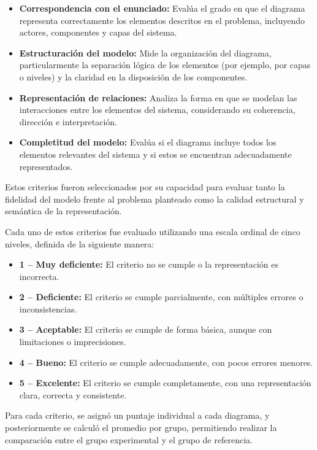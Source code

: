 \begin{itemize}
    \item \textbf{Correspondencia con el enunciado:} Evalúa el grado en que el diagrama representa correctamente los elementos descritos en el problema, incluyendo actores, componentes y capas del sistema.
    
    \item \textbf{Estructuración del modelo:} Mide la organización del diagrama, particularmente la separación lógica de los elementos (por ejemplo, por capas o niveles) y la claridad en la disposición de los componentes.
    
    \item \textbf{Representación de relaciones:} Analiza la forma en que se modelan las interacciones entre los elementos del sistema, considerando su coherencia, dirección e interpretación.
    
    \item \textbf{Completitud del modelo:} Evalúa si el diagrama incluye todos los elementos relevantes del sistema y si estos se encuentran adecuadamente representados.
\end{itemize}

\noindent
Estos criterios fueron seleccionados por su capacidad para evaluar tanto la fidelidad del modelo frente al problema planteado como la calidad estructural y semántica de la representación.

\noindent
Cada uno de estos criterios fue evaluado utilizando una escala ordinal de cinco niveles, definida de la siguiente manera:

\begin{itemize}
    \item \textbf{1 -- Muy deficiente:} El criterio no se cumple o la representación es incorrecta.
    \item \textbf{2 -- Deficiente:} El criterio se cumple parcialmente, con múltiples errores o inconsistencias.
    \item \textbf{3 -- Aceptable:} El criterio se cumple de forma básica, aunque con limitaciones o imprecisiones.
    \item \textbf{4 -- Bueno:} El criterio se cumple adecuadamente, con pocos errores menores.
    \item \textbf{5 -- Excelente:} El criterio se cumple completamente, con una representación clara, correcta y consistente.
\end{itemize}

\noindent
Para cada criterio, se asignó un puntaje individual a cada diagrama, y posteriormente se calculó el promedio por grupo, permitiendo realizar la comparación entre el grupo experimental y el grupo de referencia.

